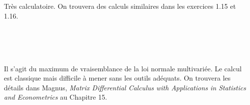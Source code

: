 \documentclass{report}
\begin{document}
\subsection{} \noindent\fbox{
\parbox{\linewidth}{

}}\\ 
\\ 
\\
\noindent Très calculatoire. On trouvera des calculs similaires dans les exercices 1.15 et 1.16.

\subsection{} \noindent\fbox{
\parbox{\linewidth}{

}}\\ 
\\ 
\\
\noindent Il s'agit du maximum de vraisemblance de la loi normale multivariée. Le calcul est classique mais difficile à mener sans les outils adéquats. On trouvera les détails dans Magnus, \textit{Matrix Differential Calculus with Applications in Statistics and Econometrics} au Chapitre 15.
\end{document}

